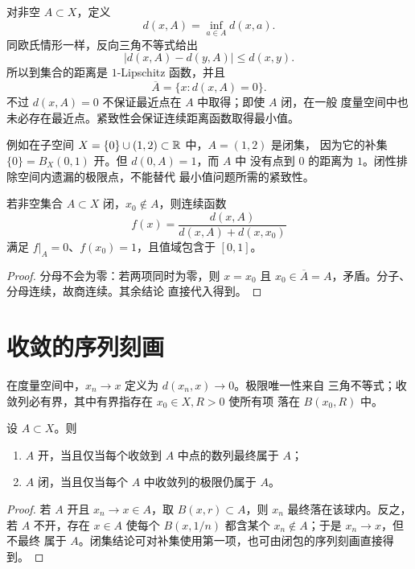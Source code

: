 对非空 \(A\subset X\)，定义
\[
 d(x,A)=\inf_{a\in A}d(x,a).
\]
同欧氏情形一样，反向三角不等式给出
\[
 |d(x,A)-d(y,A)|\le d(x,y).
\]
所以到集合的距离是 \(1\)-Lipschitz 函数，并且
\[
 \overline A=\{x:d(x,A)=0\}.
\]
不过 \(d(x,A)=0\) 不保证最近点在 \(A\) 中取得；即使 \(A\) 闭，在一般
度量空间中也未必存在最近点。紧致性会保证连续距离函数取得最小值。

例如在子空间 \(X=\{0\}\cup(1,2)\subset\mathbb{R}\) 中，\(A=(1,2)\) 是闭集，
因为它的补集 \(\{0\}=B_X(0,1)\) 开。但 \(d(0,A)=1\)，而 \(A\) 中
没有点到 \(0\) 的距离为 \(1\)。闭性排除空间内遗漏的极限点，不能替代
最小值问题所需的紧致性。

\begin{proposition}[闭集的分离函数]
若非空集合 \(A\subset X\) 闭，\(x_0\notin A\)，则连续函数
\[
 f(x)=\frac{d(x,A)}{d(x,A)+d(x,x_0)}
\]
满足 \(f|_A=0\)、\(f(x_0)=1\)，且值域包含于 \([0,1]\)。
\end{proposition}

\begin{proof}
分母不会为零：若两项同时为零，则 \(x=x_0\) 且
\(x_0\in\overline A=A\)，矛盾。分子、分母连续，故商连续。其余结论
直接代入得到。
\end{proof}

\section{收敛的序列刻画}

在度量空间中，\(x_n\to x\) 定义为 \(d(x_n,x)\to0\)。极限唯一性来自
三角不等式；收敛列必有界，其中有界指存在 \(x_0\in X,R>0\) 使所有项
落在 \(B(x_0,R)\) 中。

\begin{theorem}[开闭集与序列]
\label{thm:metric-sequential-open-closed}
设 \(A\subset X\)。则
\begin{enumerate}[label=\textup{(\roman*)}]
 \item \(A\) 开，当且仅当每个收敛到 \(A\) 中点的数列最终属于 \(A\)；
 \item \(A\) 闭，当且仅当每个 \(A\) 中收敛列的极限仍属于 \(A\)。
\end{enumerate}
\end{theorem}

\begin{proof}
若 \(A\) 开且 \(x_n\to x\in A\)，取 \(B(x,r)\subset A\)，则 \(x_n\)
最终落在该球内。反之，若 \(A\) 不开，存在 \(x\in A\) 使每个
\(B(x,1/n)\) 都含某个 \(x_n\notin A\)；于是 \(x_n\to x\)，但不最终
属于 \(A\)。闭集结论可对补集使用第一项，也可由闭包的序列刻画直接得到。
\end{proof}

